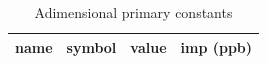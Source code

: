 \documentclass[a4paper,9pt]{article}
\begin{document}
\begin{appendix}





\listoftables{}   %
\listoffigures{}  %

\begin{table}
\caption{Adimensional primary constants}
\label{tab:1:table1}
  \hskip-2.0cm\begin{tabular}{llll}
    \toprule
    \cmidrule(r){1-4}
    name & symbol    & value & imp (ppb) \\
    \midrule
    

\end{tabular}
\end{table}
\end{appendix}
\end{document}
